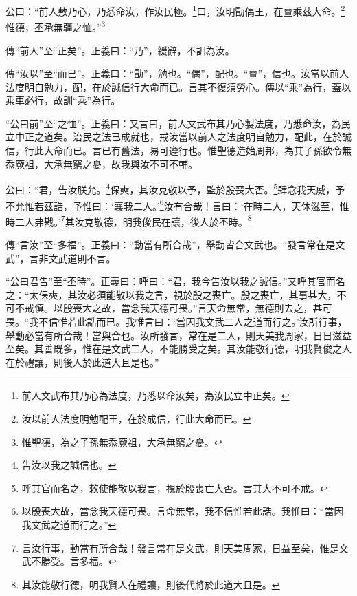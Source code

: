 公曰：“前人敷乃心，乃悉命汝，作汝民極。\footnote{前人文武布其乃心為法度，乃悉以命汝矣，為汝民立中正矣。}曰，汝明勖偶王，在亶乘茲大命。\footnote{汝以前人法度明勉配王，在於成信，行此大命而已。}惟德，丕承無疆之恤。”\footnote{惟聖德，為之子孫無忝厥祖，大承無窮之憂。}


{\noindent\zhuan{}\fzbyks 傳“前人”至“正矣”。正義曰：“乃”，緩辭，不訓為汝。 \par}

{\noindent\zhuan{}\fzbyks 傳“汝以”至“而已”。正義曰：“勖”，勉也。“偶”，配也。“亶”，信也。汝當以前人法度明自勉力，配，在於誠信行大命而已。言其不復須勞心。傳以“乘”為行，蓋以乘車必行，故訓“乘”為行。 \par}

{\noindent\shu{}\fzkt “公曰前”至“之恤”。正義曰：又言曰，前人文武布其乃心製法度，乃悉命汝，為民立中正之道矣。治民之法已成就也，戒汝當以前人之法度明自勉力，配此，在於誠信，行此大命而已。言已有舊法，易可遵行也。惟聖德造始周邦，為其子孫欲令無忝厥祖，大承無窮之憂，故我與汝不可不輔。 \par}

公曰：“君，告汝朕允。\footnote{告汝以我之誠信也。}保奭，其汝克敬以予，監於殷喪大否。\footnote{呼其官而名之，敕使能敬以我言，視於殷喪亡大否。言其大不可不戒。}肆念我天威，予不允惟若茲誥，予惟曰：‘襄我二人。’\footnote{以殷喪大故，當念我天德可畏。言命無常，我不信惟若此誥。我惟曰：“當因我文武之道而行之。”}汝有合哉！言曰：‘在時二人，天休滋至，惟時二人弗戡。’\footnote{言汝行事，動當有所合哉！發言常在是文武，則天美周家，日益至矣，惟是文武不勝受。言多福。}其汝克敬德，明我俊民在讓，後人於丕時。\footnote{其汝能敬行德，明我賢人在禮讓，則後代將於此道大且是。}


{\noindent\zhuan{}\fzbyks 傳“言汝”至“多福”。正義曰：“動當有所合哉”，舉動皆合文武也。“發言常在是文武”，言非文武道則不言。 \par}

{\noindent\shu{}\fzkt “公曰君告”至“丕時”。正義曰：呼曰：“君，我今告汝以我之誠信。”又呼其官而名之：“太保奭，其汝必須能敬以我之言，視於殷之喪亡。殷之喪亡，其事甚大，不可不戒慎。以殷喪大之故，當念我天德可畏。”言天命無常，無德則去之，甚可畏。“我不信惟若此誥而已。我惟言曰：‘當因我文武二人之道而行之。’汝所行事，舉動必當有所合哉！當與合也。汝所發言，常在是二人，則天美我周家，日日滋益至矣。其善既多，惟在是文武二人，不能勝受之矣。其汝能敬行德，明我賢俊之人在於禮讓，則後人於此道大且是也。” \par}

